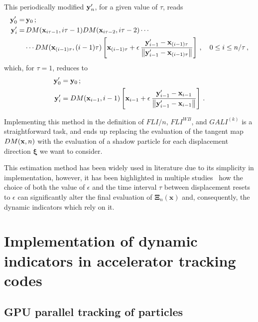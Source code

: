 This periodically modified $\vb{y}'_n$, for a given value of $\tau$, reads
\begin{equation}
    \begin{aligned}
        \vb{y}'_0 =&\, \vb{y}_0 \,;  \\
        \vb{y}'_i =&\, DM(\vb{x}_{i\tau - 1}, i\tau - 1)DM(\vb{x}_{i\tau - 2}, i\tau - 2)\cdots \\
        &\cdots DM(\vb{x}_{(i-1)\tau}, (i-1)\tau)\left[\vb{x}_{(i-1)\tau}+\epsilon\,\frac{\vb{y}'_{i-1}-\vb{x}_{(i-1)\tau}}{\norm{\vb{y}'_{i-1}-\vb{x}_{(i-1)\tau}}}\right]\,, \quad 0 \leq i \leq n/\tau \,,        
    \end{aligned}
\end{equation}
which, for $\tau=1$, reduces to
\begin{equation}
\begin{aligned}
    \vb{y}'_0 &= \vb{y}_0 \,; \\
    \vb{y}'_i &= DM(\vb{x}_{i-1}, i-1)\left[\vb{x}_{i-1}+\epsilon\,\frac{\vb{y}'_{i-1}-\vb{x}_{i-1}}{\norm{\vb{y}'_{i-1}-\vb{x}_{i-1}}}\right]\,.
\end{aligned}
\end{equation}

Implementing this method in the definition of $FLI/n$, $FLI^{WB}$, and $GALI^{(k)}$ is a straightforward task, and ends up replacing the evaluation of the tangent map $DM(\vb{x}, n)$ with the evaluation of a shadow particle for each displacement direction $\boldsymbol{\xi}$ we want to consider.

This estimation method has been widely used in literature due to its simplicity in implementation, however, it has been highlighted in multiple studies~\cite{} how the choice of both the value of $\epsilon$ and the time interval $\tau$ between displacement resets to $\epsilon$ can significantly alter the final evaluation of $\boldsymbol{\Xi}_{n}(\mathbf{x})$ and, consequently, the dynamic indicators which rely on it.


\section{Implementation of dynamic indicators in accelerator tracking codes} \label{sec:implement}
%

\subsection{GPU parallel tracking of particles}

